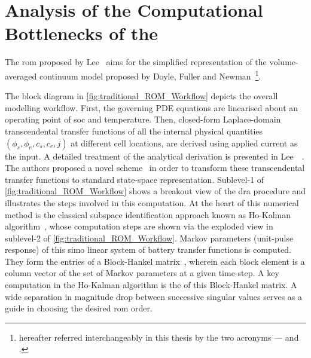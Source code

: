 \section{Analysis of the Computational Bottlenecks of the } \label{sec:Analysis-of-the}

The \gls{rom}  proposed by  Lee~\etal{} aims  for the  simplified representation
of  the    volume-averaged  continuum  model  proposed  by  Doyle,
Fuller   and   Newman~\cite{Doyle1993a,Fuller1994}\footnote{hereafter   referred
interchangeably in  this thesis  by the two  acronyms ---   and
.}.


The  block diagram  in \cref{fig:traditional_ROM_Workflow}  depicts the  overall
modelling workflow. First,  the governing PDE equations are  linearised about an
operating point  of \gls{soc} and temperature.  Then, closed-form Laplace-domain
transcendental  transfer  functions  of  all the  internal  physical  quantities
$\left(\phi_{s},\phi_{e},c_{s},c_{e},j\right)$  at   different  cell  locations,
are  derived  using applied  current  as  the  input.  A detailed  treatment  of
the  analytical  derivation  is   presented  in  Lee~\etal~\cite{Lee2012a}.  The
authors  proposed  a novel    scheme~\cite{Lee2012b}  in order  to
transform  these  transcendental  transfer  functions  to  standard  state-space
representation.   Sublevel-1   of \cref{fig:traditional_ROM_Workflow}  shows   a
breakout view of  the \gls{dra} procedure and illustrates the  steps involved in
this  computation. At  the  heart  of this  numerical  method  is the  classical
subspace  identification approach  known as  Ho-Kalman algorithm~\cite{HO1966a},
whose  computation  steps  are  shown   via  the  exploded  view  in  sublevel-2
of \cref{fig:traditional_ROM_Workflow}. Markov  parameters (unit-pulse response)
of this \gls{simo} linear system of battery transfer functions is computed. They
form the entries  of a Block-Hankel matrix~\cite{Ljung1998},  wherein each block
element is a column vector of the set of Markov parameters at a given time-step.
A  key computation  in the  Ho-Kalman algorithm  is the   of  this
Block-Hankel  matrix. A  wide separation  in magnitude  drop between  successive
singular values serves as a guide in choosing the desired \gls{rom} order.

